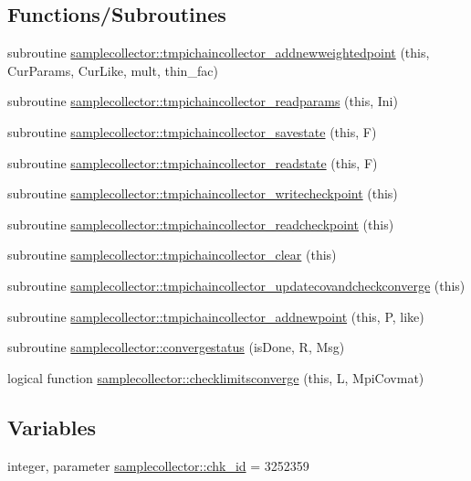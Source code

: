 \subsection*{Functions/\+Subroutines}
\begin{DoxyCompactItemize}
\item 
subroutine \mbox{\hyperlink{namespacesamplecollector_ac96bef33ce0ce505eee01406eafe5149}{samplecollector\+::tmpichaincollector\+\_\+addnewweightedpoint}} (this, Cur\+Params, Cur\+Like, mult, thin\+\_\+fac)
\item 
subroutine \mbox{\hyperlink{namespacesamplecollector_ac3a30bf96000547a9f7264b18de0c72a}{samplecollector\+::tmpichaincollector\+\_\+readparams}} (this, Ini)
\item 
subroutine \mbox{\hyperlink{namespacesamplecollector_ab16744dcc4f11cae903c0fdb4daee0fb}{samplecollector\+::tmpichaincollector\+\_\+savestate}} (this, F)
\item 
subroutine \mbox{\hyperlink{namespacesamplecollector_a7c25b3057e5a67cd55bfe6b4edecc647}{samplecollector\+::tmpichaincollector\+\_\+readstate}} (this, F)
\item 
subroutine \mbox{\hyperlink{namespacesamplecollector_af8bf18826b2f8249278410b12ee73c22}{samplecollector\+::tmpichaincollector\+\_\+writecheckpoint}} (this)
\item 
subroutine \mbox{\hyperlink{namespacesamplecollector_a728766fe371777731c80f0e82ccba130}{samplecollector\+::tmpichaincollector\+\_\+readcheckpoint}} (this)
\item 
subroutine \mbox{\hyperlink{namespacesamplecollector_ad209f28cb743e15c21d107934917f478}{samplecollector\+::tmpichaincollector\+\_\+clear}} (this)
\item 
subroutine \mbox{\hyperlink{namespacesamplecollector_a92e783bc78c7af280b704150840b84cb}{samplecollector\+::tmpichaincollector\+\_\+updatecovandcheckconverge}} (this)
\item 
subroutine \mbox{\hyperlink{namespacesamplecollector_a30e39ef70fabba57b75d0ddea5f75e84}{samplecollector\+::tmpichaincollector\+\_\+addnewpoint}} (this, P, like)
\item 
subroutine \mbox{\hyperlink{namespacesamplecollector_aedac586422a605cbd11d9c0892242684}{samplecollector\+::convergestatus}} (is\+Done, R, Msg)
\item 
logical function \mbox{\hyperlink{namespacesamplecollector_aa4decfd3d422ec7bc2ca897a53e155c1}{samplecollector\+::checklimitsconverge}} (this, L, Mpi\+Covmat)
\end{DoxyCompactItemize}
\subsection*{Variables}
\begin{DoxyCompactItemize}
\item 
integer, parameter \mbox{\hyperlink{namespacesamplecollector_a029f9e194c92603bd4274671b736f565}{samplecollector\+::chk\+\_\+id}} = 3252359
\end{DoxyCompactItemize}
